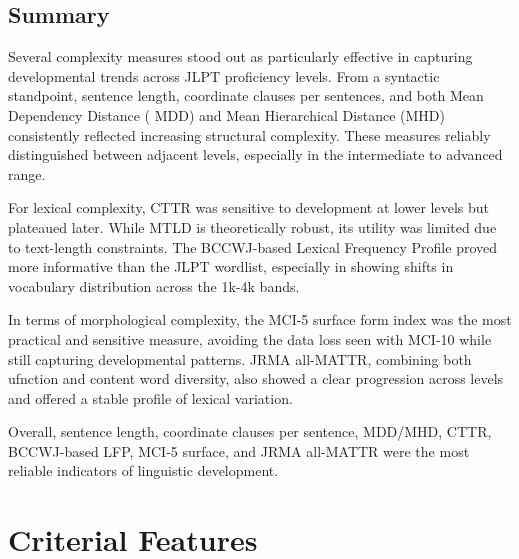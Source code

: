 \subsection{Summary}
Several complexity measures stood out as particularly effective in capturing developmental trends across JLPT
proficiency levels.
From a syntactic standpoint, sentence length, coordinate clauses per sentences, and both Mean Dependency Distance (
MDD) and Mean Hierarchical Distance (MHD) consistently reflected increasing structural complexity. These measures
reliably distinguished between adjacent levels, especially in the intermediate to advanced range.

For lexical complexity, CTTR was sensitive to development at lower levels but plateaued later. While MTLD is
theoretically robust, its utility was limited due to text-length constraints. The BCCWJ-based Lexical Frequency
Profile proved more informative than the JLPT wordlist, especially in showing shifts in vocabulary distribution
across the 1k-4k bands.

In terms of morphological complexity, the MCI-5 surface form index was the most practical and sensitive measure,
avoiding the data loss seen with MCI-10 while still capturing developmental patterns. JRMA all-MATTR, combining both
ufnction and content word diversity, also showed a clear progression across levels and offered a stable profile of
lexical variation.

Overall, sentence length, coordinate clauses per sentence, MDD/MHD, CTTR, BCCWJ-based LFP, MCI-5 surface, and JRMA
all-MATTR were the most reliable indicators of linguistic development.

\section{Criterial Features}



